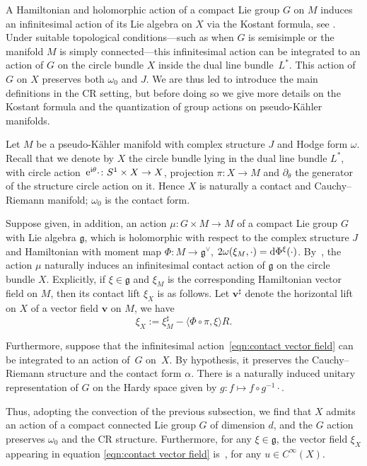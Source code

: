 \documentclass[pdftex]{sigma}
\numberwithin{equation}{section}
\begin{document}
A Hamiltonian and holomorphic action of a compact Lie group $G$ on $M$ induces an infinitesimal action of its Lie algebra on $X$ via the Kostant formula, see \cite{ko}. Under suitable topological conditions—such as when $G$ is semisimple or the manifold $M$ is simply connected—this infinitesimal action can be integrated to an action of $G$ on the circle bundle $X$ inside the dual line bundle~$L^*$. This action of $G$ on $X$ preserves both $\omega_0$ and $J$. We are thus led to introduce the main definitions in the CR setting, but before doing so we give more details on the Kostant formula and the quantization of group actions on pseudo-K\"ahler manifolds.

Let $M$ be a pseudo-K\"ahler manifold with complex structure $J$ and Hodge form $\omega$. Recall that we denote by $X$ the circle bundle lying in the dual line bundle $L^*$, with circle action~${{\rm e}^{{\rm i}\theta}\cdot \colon S^1\times X\rightarrow X}$, projection $\pi\colon X\rightarrow M$ and $\partial_\theta$ the generator of the structure circle action on it. Hence $X$ is naturally a contact and Cauchy--Riemann manifold; $\omega_0$ is the contact form.

Suppose given, in addition, an action $\mu \colon G\times M\rightarrow M$ of a compact Lie group $G$ with Lie algebra $\mathfrak{g}$, which is holomorphic with respect to the complex structure $J$ and Hamiltonian with moment map $\Phi\colon M\rightarrow \mathfrak{g}^\vee$,
$2 \omega(\xi_M, \cdot)={\rm d}\Phi^{\xi}(\cdot)$.
By~\cite{ko}, the action $\mu$ naturally induces an infinitesimal contact action of $\mathfrak{g}$ on the circle bundle $X$. Explicitly, if $\xi\in \mathfrak{g}$ and $\xi_M$ is the corresponding Hamiltonian vector field on $M$, then its contact lift $\xi_X$ is as follows.
Let $\mathbf{v}^\sharp$ denote the horizontal lift on $X$ of a vector field $\mathbf{v}$ on $M$, we have
\begin{equation}\label{eqn:contact vector field}
\xi_X:= \xi_M^\sharp-\langle \Phi\circ \pi, \xi\rangle R .
\end{equation}

Furthermore, suppose that the infinitesimal action~\eqref{eqn:contact vector field} can be integrated to an action of~$G$ on~$X$. By hypothesis, it preserves the Cauchy--Riemann structure and the contact form $\alpha$. There is a naturally induced unitary representation of $G$ on the Hardy space
 given by
$ g \colon f \mapsto f\circ {g^{-1}}\cdot$.
	
Thus, adopting the convection of the previous subsection, we find that $X$ admits an action of a compact connected Lie group $G$ of dimension $d$, and the $G$ action preserves $\omega_0$ and the CR structure. Furthermore, for any $\xi \in \mathfrak{g}$, the vector field $\xi_X$ appearing in equation \eqref{eqn:contact vector field} is~, for any $u\in {C}^\infty(X)$.
	
\end{document}
